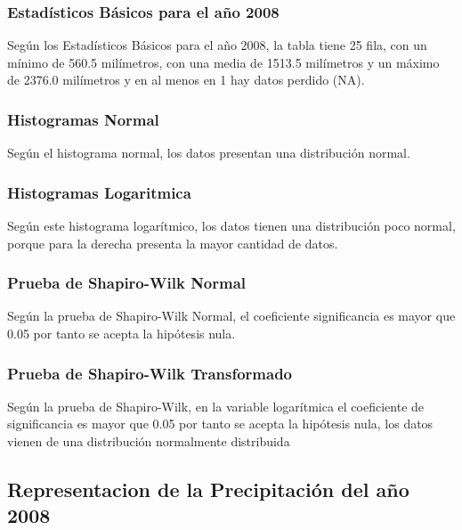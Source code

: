 \documentclass[11pt,]{article}
\begin{document}
\subsubsection{Estadísticos Básicos para el año
2008}\label{estaduxedsticos-buxe1sicos-para-el-auxf1o-2008}

Según los Estadísticos Básicos para el año 2008, la tabla tiene 25 fila,
con un mínimo de 560.5 milímetros, con una media de 1513.5 milímetros y
un máximo de 2376.0 milímetros y en al menos en 1 hay datos perdido
(NA).

\subsubsection{Histogramas Normal}\label{histogramas-normal}

Según el histograma normal, los datos presentan una distribución normal.

\subsubsection{Histogramas Logaritmica}\label{histogramas-logaritmica}

Según este histograma logarítmico, los datos tienen una distribución
poco normal, porque para la derecha presenta la mayor cantidad de datos.

\subsubsection{Prueba de Shapiro-Wilk
Normal}\label{prueba-de-shapiro-wilk-normal}

Según la prueba de Shapiro-Wilk Normal, el coeficiente significancia es
mayor que 0.05 por tanto se acepta la hipótesis nula.

\subsubsection{Prueba de Shapiro-Wilk
Transformado}\label{prueba-de-shapiro-wilk-transformado}

Según la prueba de Shapiro-Wilk, en la variable logarítmica el
coeficiente de significancia es mayor que 0.05 por tanto se acepta la
hipótesis nula, los datos vienen de una distribución normalmente
distribuida

\subsection{Representacion de la Precipitación del año
2008}\label{representacion-de-la-precipitaciuxf3n-del-auxf1o-2008}
\end{document}
